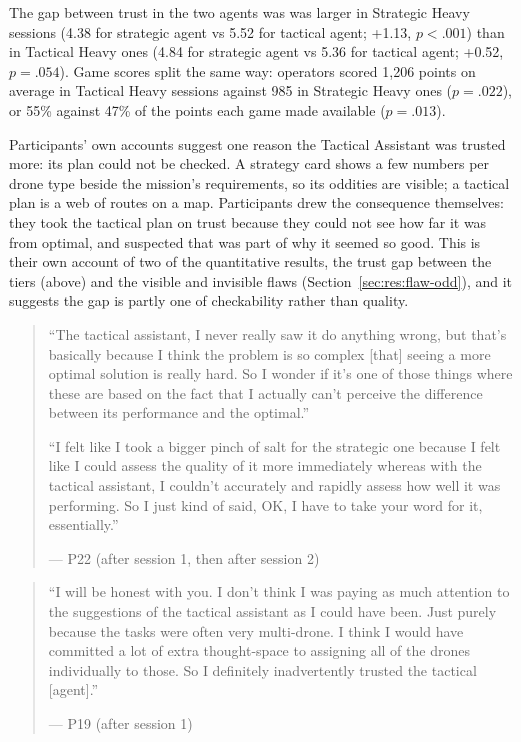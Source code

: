 The gap between trust in the two agents was was larger in Strategic Heavy sessions (4.38 for strategic agent vs 5.52 for tactical agent; +1.13, $p < .001$) than in Tactical Heavy ones (4.84 for strategic agent vs 5.36 for tactical agent; +0.52, $p = .054$){\color{blue}. Game scores split the same way: operators scored 1,206 points on average in Tactical Heavy sessions against 985 in Strategic Heavy ones ($p = .022$), or 55\% against 47\% of the points each game made available ($p = .013$).}

\label{sec:qual:trust-unchecked}\label{sec:qual:trust-unchecked:cant-check}
{\color{blue}Participants' own accounts suggest one reason the Tactical Assistant was trusted more: its plan could not be checked.} A strategy card shows a few numbers per drone type beside the mission's requirements, so its oddities are visible; a tactical plan is a web of routes on a map. Participants drew the consequence themselves: they took the tactical plan on trust because they could not see how far it was from optimal, and suspected that was part of why it seemed so good. This is their own account of two of the quantitative results, the trust gap between the tiers (above) and the visible and invisible flaws (Section~\ref{sec:res:flaw-odd}), and it suggests the gap is partly one of checkability rather than quality.

\begin{quote}\small
``The tactical assistant, I never really saw it do anything wrong, but that's basically because I think the problem is so complex [that] seeing a more optimal solution is really hard. So I wonder if it's one of those things where these are based on the fact that I actually can't perceive the difference between its performance and the optimal.''\par\smallskip
``I felt like I took a bigger pinch of salt for the strategic one because I felt like I could assess the quality of it more immediately whereas with the tactical assistant, I couldn't accurately and rapidly assess how well it was performing. So I just kind of said, OK, I have to take your word for it, essentially.''\par\hfill--- P22 {\color{blue}(after session 1, then after session 2)}
\end{quote}

\begin{quote}\small
``I will be honest with you. I don't think I was paying as much attention to the suggestions of the tactical assistant as I could have been. Just purely because the tasks were often very multi-drone. I think I would have committed a lot of extra thought-space to assigning all of the drones individually to those. So I definitely inadvertently trusted the tactical [agent].''\par\hfill--- P19 (after session 1)
\end{quote}

